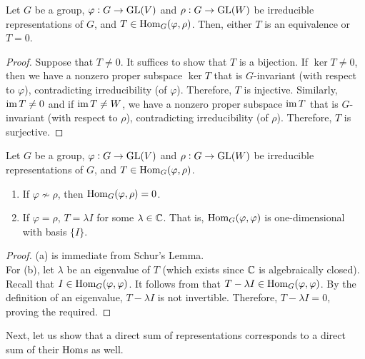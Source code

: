 		\begin{flem}
			\label{lem: schurs lemma}
			Let $G$ be a group, $\varphi : G \to \operatorname{GL}(V)$ and $\rho : G \to \operatorname{GL}(W)$ be irreducible representations of $G$, and $T \in \operatorname{Hom}_G(\varphi,\rho)$. Then, either $T$ is an equivalence or $T = 0$.
		\end{flem}
		\begin{proof}
			Suppose that $T \ne 0$. It suffices to show that $T$ is a bijection. If $\ker T \ne 0$, then we have a nonzero proper subspace $\ker T$ that is $G$-invariant (with respect to $\varphi$), contradicting irreducibility (of $\varphi$). Therefore, $T$ is injective. Similarly, $\operatorname{im} T \ne 0$ and if $\operatorname{im} T \ne W$, we have a nonzero proper subspace $\operatorname{im} T$ that is $G$-invariant (with respect to $\rho$), contradicting irreducibility (of $\rho$). Therefore, $T$ is surjective.
		\end{proof}

		\begin{fcor}
			\label{cor: schurs corollary}
			Let $G$ be a group, $\varphi : G \to \operatorname{GL}(V)$ and $\rho : G \to \operatorname{GL}(W)$ be irreducible representations of $G$, and $T \in \operatorname{Hom}_G(\varphi,\rho)$.
			\begin{enumerate}[label=(\alph*)]
				\item If $\varphi \not\sim \rho$, then $\operatorname{Hom}_G(\varphi,\rho) = 0$.
				\item If $\varphi = \rho$, $T = \lambda I$ for some $\lambda \in \mathbb{C}$. That is, $\operatorname{Hom}_G (\varphi,\varphi)$ is one-dimensional with basis $\{I\}$.
			\end{enumerate}
		\end{fcor}
		\begin{proof}
			(a) is immediate from Schur's Lemma.\\
			For (b), let $\lambda$ be an eigenvalue of $T$ (which exists since $\mathbb{C}$ is algebraically closed). Recall that $I \in \operatorname{Hom}_G(\varphi,\varphi)$. It follows from  that $T - \lambda I \in \operatorname{Hom}_G(\varphi,\varphi)$. By the definition of an eigenvalue, $T - \lambda I$ is not invertible. Therefore, $T - \lambda I = 0$, proving the required.
		\end{proof}

		Next, let us show that a direct sum of representations corresponds to a direct sum of their $\operatorname{Hom}$s as well.

